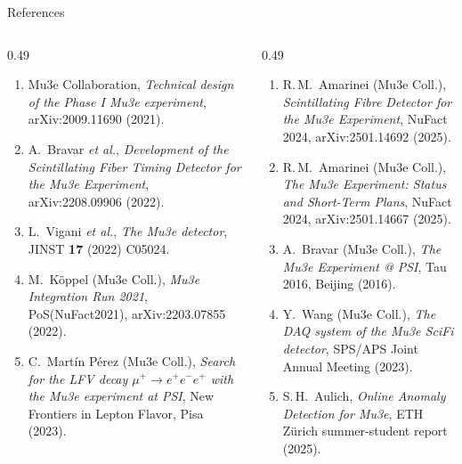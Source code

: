 \documentclass[11pt,aspectratio=169]{beamer}
\begin{document}
\begin{frame}{References}
  \vspace{-2mm}
  \tiny
  \setlength{\leftmargini}{1.5em}
  \begin{columns}[onlytextwidth,T]
    \begin{column}{0.49\textwidth}
      \begin{enumerate}\setlength{\itemsep}{5pt}
        \item Mu3e Collaboration, \textit{Technical design of the Phase I Mu3e experiment}, arXiv:2009.11690 (2021).
        \item A.\ Bravar \textit{et al.}, \textit{Development of the Scintillating Fiber Timing Detector for the Mu3e Experiment}, arXiv:2208.09906 (2022).
        \item L.\ Vigani \textit{et al.}, \textit{The Mu3e detector}, JINST \textbf{17} (2022) C05024.
        \item M.\ K\"oppel (Mu3e Coll.), \textit{Mu3e Integration Run 2021}, PoS(NuFact2021), arXiv:2203.07855 (2022).
        \item C.\ Mart\'in P\'erez (Mu3e Coll.), \textit{Search for the LFV decay $\mu^+\!\to\! e^+e^-e^+$ with the Mu3e experiment at PSI}, New Frontiers in Lepton Flavor, Pisa (2023).
      \end{enumerate}
    \end{column}
    \begin{column}{0.49\textwidth}
      \begin{enumerate}\setlength{\itemsep}{5pt}\setcounter{enumi}{5}
        \item R.\,M.\ Amarinei (Mu3e Coll.), \textit{Scintillating Fibre Detector for the Mu3e Experiment}, NuFact 2024, arXiv:2501.14692 (2025).
        \item R.\,M.\ Amarinei (Mu3e Coll.), \textit{The Mu3e Experiment: Status and Short-Term Plans}, NuFact 2024, arXiv:2501.14667 (2025).
        \item A.\ Bravar (Mu3e Coll.), \textit{The Mu3e Experiment @ PSI}, Tau 2016, Beijing (2016).
        \item Y.\ Wang (Mu3e Coll.), \textit{The DAQ system of the Mu3e SciFi detector}, SPS/APS Joint Annual Meeting (2023).
        \item S.\,H.\ Aulich, \textit{Online Anomaly Detection for Mu3e}, ETH Z\"urich summer-student report (2025).
      \end{enumerate}
    \end{column}
  \end{columns}
\end{frame}
\end{document}
